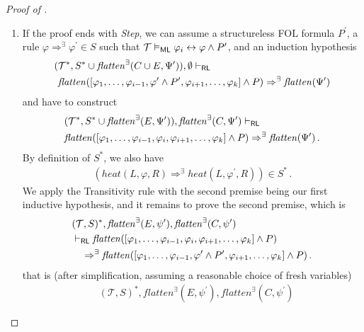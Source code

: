 \begin{proof}[Proof of ]
\begin{enumerate}
    \item If the proof ends with \emph{Step},
      we can assume a structureless FOL formula $P^\prime$, a rule $\varphi \Rightarrow^\exists \varphi^\prime \in S$ such that
      $\mathcal{T} \vDash_{\mathsf{ML}} \varphi_i \leftrightarrow \varphi \land P^\prime$,
      and an induction hypothesis
      \begin{align*}
        (&\mathcal{T}^*, S^* \cup \mathit{flatten}^\exists(C \cup E, \Psi^\prime)), \emptyset \vdash_{\mathsf{RL}}
          \\ &
          \mathit{flatten}([\varphi_1, \ldots, \varphi_{i-1}, \varphi^\prime \land P^\prime, \varphi_{i+1}, \ldots, \varphi_k] \land P) \Rightarrow^\exists \mathit{flatten}(\Psi^\prime)     
      \end{align*}
      and have to construct
      \begin{align*}
      & (\mathcal{T}^*, S^* \cup \mathit{flatten}^\exists(E, \Psi^\prime)), \mathit{flatten}^\exists(C, \Psi^\prime) \vdash_{\mathsf{RL}} \\
          & \mathit{flatten}([\varphi_1, \ldots, \varphi_{i-1}, \varphi_i, \varphi_{i+1}, \ldots, \varphi_k] \land P) \Rightarrow^\exists \mathit{flatten}(\Psi^\prime)    \, .
      \end{align*}
        By definition of $S^*$, we also have
        \begin{align*}
            (\mathit{heat}(L, \varphi, R) \Rightarrow^\exists \mathit{heat}(L, \varphi^\prime, R)) \in S^* \, .
        \end{align*}
    We apply the Transitivity rule with the second premise being our first inductive hypothesis, and it remains to prove the second premise, which is
    \begin{align*}
        & (\mathcal{T}, S)^*, \mathit{flatten}^\exists(E, \psi^\prime), \mathit{flatten}^\exists(C, \psi^\prime)
        \\& \vdash_{\mathsf{RL}}
        \mathit{flatten}([\varphi_1, \ldots, \varphi_{i-1}, \varphi_i, \varphi_{i+1}, \ldots, \varphi_k] \land P)
        \\&\quad \Rightarrow^\exists
        \mathit{flatten}([\varphi_1, \ldots, \varphi_{i-1}, \varphi^\prime \land P^\prime, \varphi_{i+1}, \ldots, \varphi_k] \land P) \, .
    \end{align*}
    that is (after simplification, assuming a reasonable choice of fresh variables)
    \begin{align*}
        & (\mathcal{T}, S)^*, \mathit{flatten}^\exists(E, \psi^\prime), \mathit{flatten}^\exists(C, \psi^\prime)

\end{align*}
\end{enumerate}
\end{proof}
